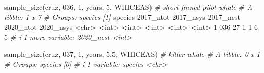 \documentclass[
]{book}
\newenvironment{Shaded}{\begin{snugshade}}{\end{snugshade}}
\newcommand{\AttributeTok}[1]{\textcolor[rgb]{0.77,0.63,0.00}{#1}}
\newcommand{\CommentTok}[1]{\textcolor[rgb]{0.56,0.35,0.01}{\textit{#1}}}
\newcommand{\DecValTok}[1]{\textcolor[rgb]{0.00,0.00,0.81}{#1}}
\newcommand{\ErrorTok}[1]{\textcolor[rgb]{0.64,0.00,0.00}{\textbf{#1}}}
\newcommand{\FloatTok}[1]{\textcolor[rgb]{0.00,0.00,0.81}{#1}}
\newcommand{\FunctionTok}[1]{\textcolor[rgb]{0.00,0.00,0.00}{#1}}
\newcommand{\NormalTok}[1]{#1}
\newcommand{\SpecialCharTok}[1]{\textcolor[rgb]{0.00,0.00,0.00}{#1}}
\newcommand{\StringTok}[1]{\textcolor[rgb]{0.31,0.60,0.02}{#1}}
\begin{document}
\begin{Shaded}
\begin{Highlighting}[]
\FunctionTok{sample\_size}\NormalTok{(cruz, }\StringTok{\textquotesingle{}036\textquotesingle{}}\NormalTok{, }\DecValTok{1}\NormalTok{, years, }\DecValTok{5}\NormalTok{, }\StringTok{\textquotesingle{}WHICEAS\textquotesingle{}}\NormalTok{) }\CommentTok{\# short{-}finned pilot whale}
\CommentTok{\# A tibble: 1 x 7}
\CommentTok{\# Groups:   species [1]}
\NormalTok{  species }\StringTok{\textasciigrave{}}\AttributeTok{2017\_ntot}\StringTok{\textasciigrave{}} \StringTok{\textasciigrave{}}\AttributeTok{2017\_nsys}\StringTok{\textasciigrave{}} \StringTok{\textasciigrave{}}\AttributeTok{2017\_nest}\StringTok{\textasciigrave{}} \StringTok{\textasciigrave{}}\AttributeTok{2020\_ntot}\StringTok{\textasciigrave{}} \StringTok{\textasciigrave{}}\AttributeTok{2020\_nsys}\StringTok{\textasciigrave{}}
  \SpecialCharTok{\textless{}}\NormalTok{chr}\SpecialCharTok{\textgreater{}}         \ErrorTok{\textless{}}\NormalTok{int}\SpecialCharTok{\textgreater{}}       \ErrorTok{\textless{}}\NormalTok{int}\SpecialCharTok{\textgreater{}}       \ErrorTok{\textless{}}\NormalTok{int}\SpecialCharTok{\textgreater{}}       \ErrorTok{\textless{}}\NormalTok{int}\SpecialCharTok{\textgreater{}}       \ErrorTok{\textless{}}\NormalTok{int}\SpecialCharTok{\textgreater{}}
\DecValTok{1} \DecValTok{036}              \DecValTok{27}           \DecValTok{1}           \DecValTok{1}           \DecValTok{6}           \DecValTok{5}
\CommentTok{\# i 1 more variable: \textasciigrave{}2020\_nest\textasciigrave{} \textless{}int\textgreater{}}

\FunctionTok{sample\_size}\NormalTok{(cruz, }\StringTok{\textquotesingle{}037\textquotesingle{}}\NormalTok{, }\DecValTok{1}\NormalTok{, years, }\FloatTok{5.5}\NormalTok{, }\StringTok{\textquotesingle{}WHICEAS\textquotesingle{}}\NormalTok{) }\CommentTok{\# killer whale}
\CommentTok{\# A tibble: 0 x 1}
\CommentTok{\# Groups:   species [0]}
\CommentTok{\# i 1 variable: species \textless{}chr\textgreater{}}


\end{Highlighting}
\end{Shaded}
\end{document}
